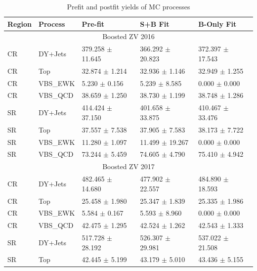 \begin{table}
  \centering
  \caption{Prefit and postfit yields of MC processes}
  \begin{tabular}{lllll}
    \toprule
    Region & Process  & Pre-fit                  & S+B Fit                  & B-Only Fit               \\
    \midrule
    \multicolumn{5}{c}{Boosted ZV 2016}                                                                \\
    \midrule
    CR     & DY+Jets  & 379.258 \( \pm \) 11.645 & 366.292 \( \pm \) 20.823 & 372.397 \( \pm \) 17.543 \\
    CR     & Top      & 32.874 \( \pm \) 1.214   & 32.936 \( \pm \) 1.146   & 32.949 \( \pm \) 1.255   \\
    CR     & VBS\_EWK & 5.230 \( \pm \) 0.156    & 5.239 \( \pm \) 8.585    & 0.000 \( \pm \) 0.000    \\
    CR     & VBS\_QCD & 38.659 \( \pm \) 1.250   & 38.730 \( \pm \) 1.199   & 38.748 \( \pm \) 1.286   \\
    SR     & DY+Jets  & 414.424 \( \pm \) 37.150 & 401.658 \( \pm \) 33.875 & 410.467 \( \pm \) 33.476 \\
    SR     & Top      & 37.557 \( \pm \) 7.538   & 37.905 \( \pm \) 7.583   & 38.173 \( \pm \) 7.722   \\
    SR     & VBS\_EWK & 11.280 \( \pm \) 1.097   & 11.499 \( \pm \) 19.267  & 0.000 \( \pm \) 0.000    \\
    SR     & VBS\_QCD & 73.244 \( \pm \) 5.459   & 74.605 \( \pm \) 4.790   & 75.410 \( \pm \) 4.942   \\
    \midrule
    \multicolumn{5}{c}{Boosted ZV 2017}                                                                \\
    \midrule
    CR     & DY+Jets  & 482.465 \( \pm \) 14.680 & 477.902 \( \pm \) 22.557 & 484.890 \( \pm \) 18.593 \\
    CR     & Top      & 25.458 \( \pm \) 1.980   & 25.347 \( \pm \) 1.839   & 25.335 \( \pm \) 1.986   \\
    CR     & VBS\_EWK & 5.584 \( \pm \) 0.167    & 5.593 \( \pm \) 8.960    & 0.000 \( \pm \) 0.000    \\
    CR     & VBS\_QCD & 42.475 \( \pm \) 1.295   & 42.524 \( \pm \) 1.262   & 42.543 \( \pm \) 1.333   \\
    SR     & DY+Jets  & 517.728 \( \pm \) 28.192 & 526.307 \( \pm \) 29.981 & 537.022 \( \pm \) 21.508 \\
    SR     & Top      & 42.445 \( \pm \) 5.199   & 43.179 \( \pm \) 5.010   & 43.436 \( \pm \) 5.155   \\

\end{tabular}
\end{table}
